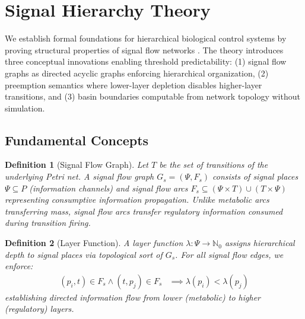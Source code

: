 \documentclass[10pt,letterpaper]{article}
\newtheorem{definition}{Definition}
\begin{document}
\section{Signal Hierarchy Theory}

We establish formal foundations for hierarchical biological control systems by proving structural properties of signal flow networks \cite{petri1962,murata1989}. The theory introduces three conceptual innovations enabling threshold predictability: (1) signal flow graphs as directed acyclic graphs enforcing hierarchical organization, (2) preemption semantics where lower-layer depletion disables higher-layer transitions, and (3) basin boundaries computable from network topology without simulation.

\subsection{Fundamental Concepts}

\begin{definition}[Signal Flow Graph]
Let $T$ be the set of transitions of the underlying Petri net. A signal flow graph $G_s = (\Psi, F_s)$ consists of signal places $\Psi \subseteq P$ (information channels) and signal flow arcs $F_s \subseteq (\Psi \times T) \cup (T \times \Psi)$ representing consumptive information propagation. Unlike metabolic arcs transferring mass, signal flow arcs transfer regulatory information consumed during transition firing.
\end{definition}

\begin{definition}[Layer Function]
A layer function $\lambda: \Psi \rightarrow \mathbb{N}_0$ assigns hierarchical depth to signal places via topological sort of $G_s$. For all signal flow edges, we enforce:
\begin{align*}
(p_i,t) \in F_s \wedge (t,p_j) \in F_s &\implies \lambda(p_i) < \lambda(p_j)
\end{align*}
establishing directed information flow from lower (metabolic) to higher (regulatory) layers.
\end{definition}
\end{document}
